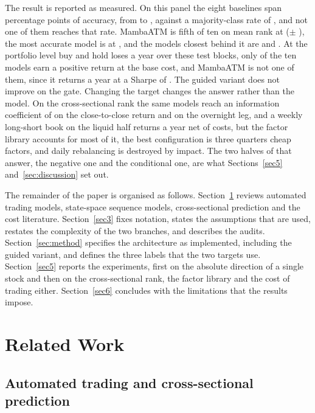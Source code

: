\documentclass[pdflatex,sn-mathphys-ay]{sn-jnl}
\theoremstyle{thmstyleone}%
\theoremstyle{thmstyletwo}%
\theoremstyle{thmstyletwo}%
\begin{document}
The result is reported as measured. On this panel the eight baselines span \rangeAcc{} percentage
points of accuracy, from \accWorst{} to \accBest, against a majority-class rate of \accMaj, and not
one of them reaches that rate. MambaATM is fifth of ten on mean rank at \accProp{}
($\pm$ \accPropSd), the most accurate model is \accBestName{} at \accBest, and the models closest
behind it are \accLSTM{} and \accAtt{}. At the portfolio level buy and hold loses \portAnnBH{} a year
over these test blocks, only \nPortProfit{} of the ten models earn a positive return at the base
cost, and MambaATM is not one of them, since it returns \portAnnProp{} a year at a Sharpe of
\portShProp. The guided variant does not improve on the gate. Changing the target changes the answer
rather than the model. On the cross-sectional rank the same models reach an information coefficient
of \icCcProp{} on the close-to-close return and \icOnProp{} on the overnight leg, and a weekly
long-short book on the liquid half returns \netWk{} a year net of costs, but the factor library
accounts for most of it, the best configuration is three quarters cheap factors, and daily
rebalancing is destroyed by impact. The two halves of that answer, the negative one and the
conditional one, are what Sections~\ref{sec5} and~\ref{sec:discussion} set out.

The remainder of the paper is organised as follows. Section~\ref{sec2} reviews automated trading
models, state-space sequence models, cross-sectional prediction and the cost literature.
Section~\ref{sec3} fixes notation, states the assumptions that are used, restates the complexity of
the two branches, and describes the audits. Section~\ref{sec:method} specifies the architecture as
implemented, including the guided variant, and defines the three labels that the two targets use.
Section~\ref{sec5} reports the experiments, first on the absolute direction of a single stock and then
on the cross-sectional rank, the factor library and the cost of trading either. Section~\ref{sec6}
concludes with the limitations that the results impose.

\section{Related Work}\label{sec2}

\subsection{Automated trading and cross-sectional prediction}
\end{document}
